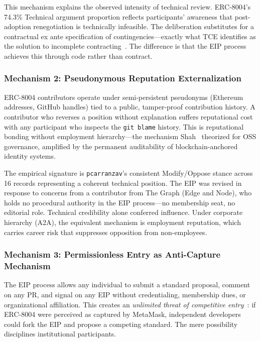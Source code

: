 \documentclass[conference]{IEEEtran}
\begin{document}
This mechanism explains the observed intensity of technical review.
ERC-8004's 74.3\% Technical argument proportion reflects participants'
awareness that post-adoption renegotiation is technically infeasible. The
deliberation substitutes for a contractual ex ante specification of
contingencies---exactly what TCE identifies as the solution to incomplete
contracting~\cite{williamson1985}. The difference is that the EIP process
achieves this through code rather than contract.

\subsubsection{Mechanism 2: Pseudonymous Reputation Externalization}

ERC-8004 contributors operate under semi-persistent pseudonyms
(Ethereum addresses, GitHub handles) tied to a public, tamper-proof
contribution history. A contributor who reverses a position without
explanation suffers reputational cost with any participant who inspects
the \texttt{git blame} history. This is reputational bonding without
employment hierarchy---the mechanism Shah~\cite{shah2006} theorized for OSS
governance, amplified by the permanent auditability of blockchain-anchored
identity systems.

The empirical signature is \texttt{pcarranzav}'s consistent Modify/Oppose
stance across 16 records representing a coherent technical position. The
EIP was revised in response to concerns from a contributor from The Graph
(Edge and Node), who holds no procedural authority in the EIP process---no
membership seat, no editorial role. Technical credibility alone conferred
influence. Under corporate hierarchy (A2A), the equivalent mechanism is
employment reputation, which carries career risk that suppresses opposition
from non-employees.

\subsubsection{Mechanism 3: Permissionless Entry as Anti-Capture Mechanism}

The EIP process allows any individual to submit a standard proposal,
comment on any PR, and signal on any EIP without credentialing,
membership dues, or organizational affiliation. This creates an
\textit{unlimited threat of competitive entry}~\cite{west2003}: if ERC-8004
were perceived as captured by MetaMask, independent developers could fork
the EIP and propose a competing standard. The mere possibility disciplines
institutional participants.
\end{document}
